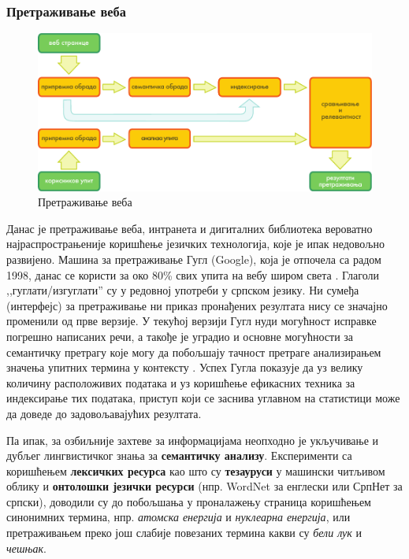 {\begin{multicols}{2}
 \subsubsection {Претраживање веба}


\begin{figure}[htb]
  \center
  \includegraphics[width=\textwidth]{../_media/serbian/web_search_architecture}
  \caption{Претраживање веба}
  \label{fig:websearcharch_sr}
\end{figure}

Данас је претраживање веба, интранета и дигиталних библиотека вероватно најраспрострањеније коришћење језичких технологија, које је ипак недовољно развијено. Машина за претраживање Гугл (Google), која је отпочела са радом 1998, данас се користи за око 80\% свих упита на вебу широм света \cite{SPIEGEL}. Глаголи ,,гуглати/изгуглати'' су у редовној употреби у српском језику. Ни сумеђа (интерфејс) за претраживање ни приказ пронађених резултата нису се значајно променили од прве верзије. У текућој верзији Гугл нуди могућност исправке погрешно написаних речи, а такође је уградио и основне могућности за семантичку претрагу које могу да побољшају тачност претраге анализирањем значења упитних термина у контексту \cite{PCWORLD}.  Успех Гугла показује да уз велику количину расположивих података и уз коришћење ефикасних техника за индексирање тих података, приступ који се заснива углавном на статистици може да доведе до задовољавајућих резултата.  

Па ипак, за озбиљније захтеве за информацијама неопходно је укључивање и дубљег лингвистичког знања за \textbf{семантичку анализу}. Експерименти са коришћењем \textbf{лексичких ресурса} као што су \textbf{тезауруси} у машински читљивом облику и \textbf{онтолошки језички ресурси} (нпр. WordNet за енглески или СрпНет за српски), доводили су до побољшања у проналажењу страница коришћењем синонимних термина, нпр. \textit{атомска енергија} и \textit{нуклеарна енергија}, или претраживањем преко још слабије повезаних термина какви су \textit{бели лук} и \textit{чешњак}. 


\end{multicols}}
